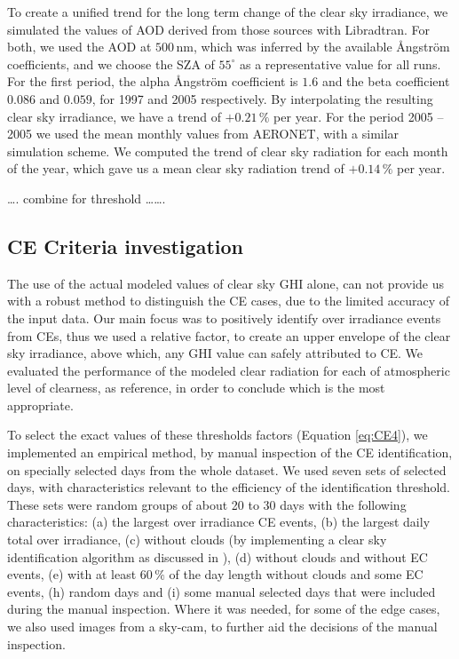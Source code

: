 \documentclass[preprint, 3p,
authoryear]{elsarticle} %
\begin{document}
To create a unified trend for the long term change of the clear sky
irradiance, we simulated the values of AOD derived from those sources
with Libradtran. For both, we used the AOD at \(500\,\text{nm}\), which
was inferred by the available Ångström coefficients, and we choose the
SZA of \(55^\circ\) as a representative value for all runs. For the
first period, the alpha Ångström coefficient is \(1.6\) and the beta
coefficient \(0.086\) and \(0.059\), for 1997 and 2005 respectively. By
interpolating the resulting clear sky irradiance, we have a trend of
\(+0.21\,\%\) per year. For the period 2005 -- 2005 we used the mean
monthly values from AERONET, with a similar simulation scheme. We
computed the trend of clear sky radiation for each month of the year,
which gave us a mean clear sky radiation trend of \(+0.14\,\%\) per
year.

\ldots. combine for threshold \ldots\ldots.

\hypertarget{ce-criteria-investigation}{%
\subsection{CE Criteria investigation}\label{ce-criteria-investigation}}

The use of the actual modeled values of clear sky GHI alone, can not
provide us with a robust method to distinguish the CE cases, due to the
limited accuracy of the input data. Our main focus was to positively
identify over irradiance events from CEs, thus we used a relative
factor, to create an upper envelope of the clear sky irradiance, above
which, any GHI value can safely attributed to CE. We evaluated the
performance of the modeled clear radiation for each of atmospheric level
of clearness, as reference, in order to conclude which is the most
appropriate.

To select the exact values of these thresholds factors (Equation
\ref{eq:CE4}), we implemented an empirical method, by manual inspection
of the CE identification, on specially selected days from the whole
dataset. We used seven sets of selected days, with characteristics
relevant to the efficiency of the identification threshold. These sets
were random groups of about 20 to 30 days with the following
characteristics: (a) the largest over irradiance CE events, (b) the
largest daily total over irradiance, (c) without clouds (by implementing
a clear sky identification algorithm as discussed in
\citet{Natsis2023}), (d) without clouds and without EC events, (e) with
at least \(60\,\%\) of the day length without clouds and some EC events,
(h) random days and (i) some manual selected days that were included
during the manual inspection. Where it was needed, for some of the edge
cases, we also used images from a sky-cam, to further aid the decisions
of the manual inspection.
\end{document}
